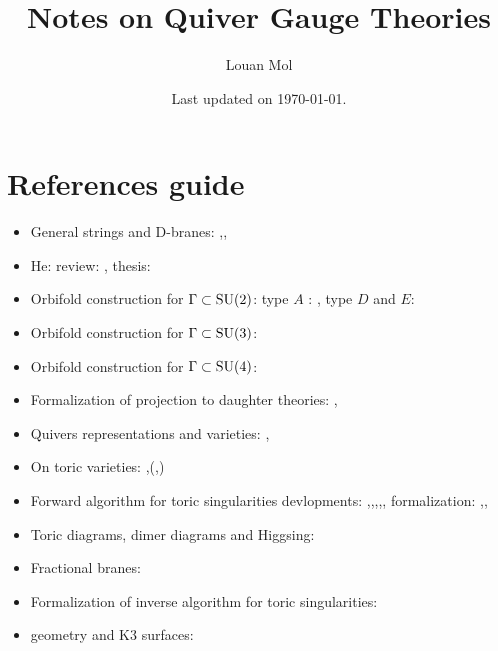 \documentclass[a4paper,10pt]{article}
\title{\textbf{Notes on Quiver Gauge Theories}}
\author{Louan Mol}
\date{Last updated on \today.}
\begin{document}
%

\maketitle

\tableofcontents

\pagebreak

\nocite{*}



\appendix

\section{References guide}

\begin{itemize}
    \item General strings and D-branes: \cite{DbranespartI},\cite{DbranespartII},\cite{notesDbranes}
    \item He: review: \cite{he2004lectures}, thesis: \cite{masterHe}
    \item Orbifold construction for $\Gamma\subset\text{SU}(2)$: type $A$ : \cite{douglas1996dbranes}, type $D$ and $E$: \cite{PhysRevD.55.6382}
    \item Orbifold construction for $\Gamma\subset\text{SU}(3)$:\cite{Hanany_1999}
    \item Orbifold construction for $\Gamma\subset\text{SU}(4)$:\cite{Hanany:1999sp}
    \item Formalization of projection to daughter theories: \cite{vafa1998},\cite{silervstein1998}
    \item Quivers representations and varieties: \cite{brion},\cite{kirillov2016quiver}
    \item On toric varieties: \cite{cox2011toric},\cite{torigeomandCY}(\cite{fulton1993introduction},\cite{oda1988convex})
    \item Forward algorithm  for toric singularities devlopments: \cite{FA1},\cite{FA2},\cite{FA3},\cite{FA4},\cite{FA5}, formalization: \cite{FA6},\cite{FA7},\cite{FA8}
    \item Toric diagrams, dimer diagrams and Higgsing: \cite{Argurio_20081}
    \item Fractional branes: \cite{Argurio_20082}
    \item Formalization of inverse algorithm for toric singularities: \cite{Feng_2001}
    \item geometry and K3 surfaces: \cite{https://doi.org/10.48550/arxiv.hep-th/9611137}

\end{itemize}
\end{document}
